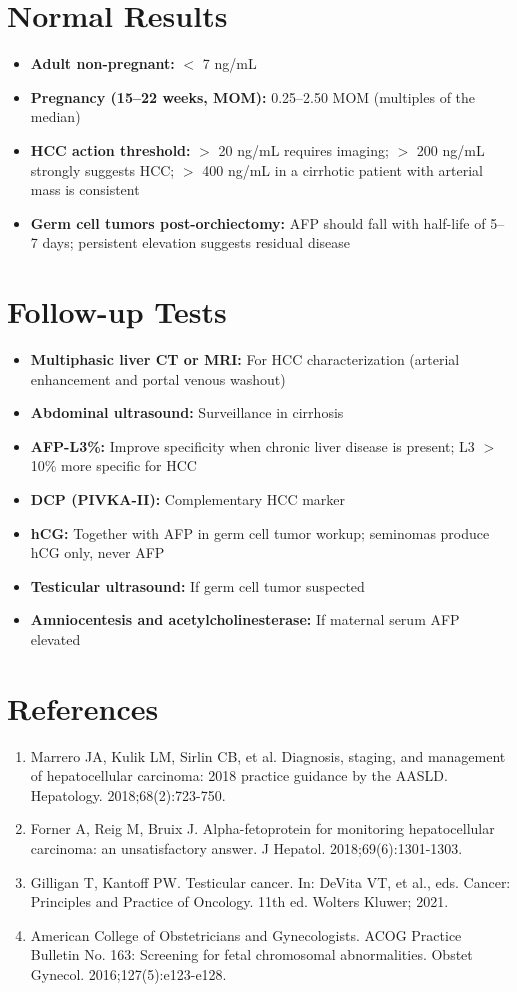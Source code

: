 \section*{Normal Results}
\begin{itemize}
  \item \textbf{Adult non-pregnant:} $<$ 7 ng/mL
  \item \textbf{Pregnancy (15--22 weeks, MOM):} 0.25--2.50 MOM (multiples of the median)
  \item \textbf{HCC action threshold:} $>$ 20 ng/mL requires imaging; $>$ 200 ng/mL strongly suggests HCC; $>$ 400 ng/mL in a cirrhotic patient with arterial mass is consistent
  \item \textbf{Germ cell tumors post-orchiectomy:} AFP should fall with half-life of 5--7 days; persistent elevation suggests residual disease
\end{itemize}

\section*{Follow-up Tests}
\begin{itemize}
  \item \textbf{Multiphasic liver CT or MRI:} For HCC characterization (arterial enhancement and portal venous washout)
  \item \textbf{Abdominal ultrasound:} Surveillance in cirrhosis
  \item \textbf{AFP-L3\%:} Improve specificity when chronic liver disease is present; L3 $>$ 10\% more specific for HCC
  \item \textbf{DCP (PIVKA-II):} Complementary HCC marker
  \item \textbf{hCG:} Together with AFP in germ cell tumor workup; seminomas produce hCG only, never AFP
  \item \textbf{Testicular ultrasound:} If germ cell tumor suspected
  \item \textbf{Amniocentesis and acetylcholinesterase:} If maternal serum AFP elevated
\end{itemize}

\section*{References}
\begin{enumerate}
  \item Marrero JA, Kulik LM, Sirlin CB, et al. Diagnosis, staging, and management of hepatocellular carcinoma: 2018 practice guidance by the AASLD. Hepatology. 2018;68(2):723-750.
  \item Forner A, Reig M, Bruix J. Alpha-fetoprotein for monitoring hepatocellular carcinoma: an unsatisfactory answer. J Hepatol. 2018;69(6):1301-1303.
  \item Gilligan T, Kantoff PW. Testicular cancer. In: DeVita VT, et al., eds. Cancer: Principles and Practice of Oncology. 11th ed. Wolters Kluwer; 2021.
  \item American College of Obstetricians and Gynecologists. ACOG Practice Bulletin No. 163: Screening for fetal chromosomal abnormalities. Obstet Gynecol. 2016;127(5):e123-e128.
\end{enumerate}

\clearpage